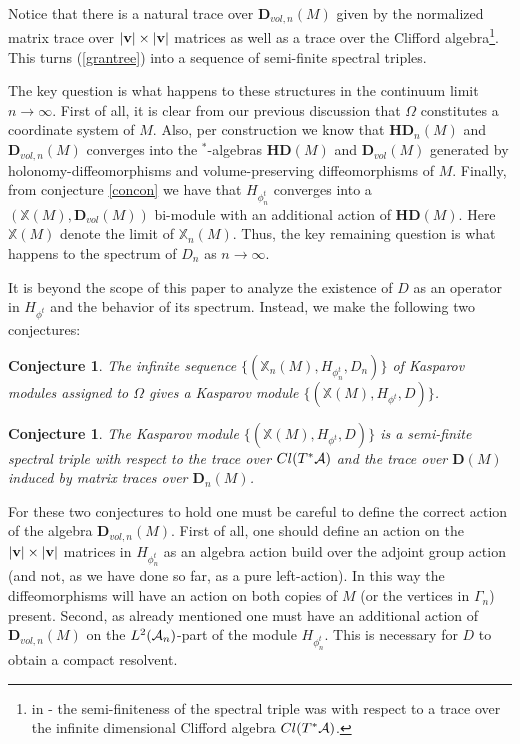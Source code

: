 \documentclass[12pt]{article}
\def\G{\Gamma}
\def\OO{\Omega}
\def\ca{{\cal A}}
\newtheorem{conj}[thm]{Conjecture}
\begin{document}
Notice that there is a natural trace over $\mathbf{D}_{vol,n}(M) $ given by the normalized matrix trace over $\vert {\bf v} \vert \times \vert {\bf v} \vert$ matrices as well as a trace over the Clifford algebra\footnote{in \cite{AGN1}-\cite{AGN3} the semi-finiteness of the spectral triple was with respect to a trace over the infinite dimensional Clifford algebra $Cl(T^*\ca)$.}. This turns (\ref{grantree}) into a sequence of semi-finite spectral triples.

The key question is what happens to these structures in the continuum limit $n\rightarrow\infty$. 
First of all, it is clear from our previous discussion that $\OO$ constitutes a coordinate system of $M$. %
Also, per construction we know that $\mathbf{HD}_n(M) $ and $\mathbf{D}_{vol,n}(M) $ converges into the $^*$-algebras $\mathbf{HD}(M) $ and $\mathbf{D}_{vol}(M) $ generated by holonomy-diffeomorphisms and volume-preserving diffeomorphisms of $M$. Finally, from conjecture \ref{concon} we have that $H_{\phi^t_n}$ converges into a $(\mathbb{X}(M) ,\mathbf{D}_{vol}(M) )$ bi-module with an additional action of $\mathbf{HD}(M) $. Here $\mathbb{X}(M)$ denote the limit of $\mathbb{X}_n(M)$. Thus, the key remaining question is what happens to the spectrum of $D_n$ as $n\rightarrow \infty$.



It is beyond the scope of this paper to analyze the existence of $D$ as an operator in $H_{\phi^t}$ and the behavior of its spectrum. Instead, we make the following two conjectures:
\begin{conj}
\label{conj1}
The infinite sequence $\{    ( \mathbb{X}_n(M)   ,  H_{\phi^t_n} ,D_n )   \} $ of Kasparov modules  assigned to $\OO$ gives a Kasparov module $\{    (  \mathbb{X}(M)  ,  H_{\phi^t} ,D )   \} $.
\end{conj}
\begin{conj}
\label{conj2}
The Kasparov module $\{    ( \mathbb{X}(M) ,  H_{\phi^t} ,D )   \} $ is a semi-finite spectral triple with respect to the trace over $Cl(T^*\ca)$  and the trace over $\mathbf{D}(M) $ induced by matrix traces over $\mathbf{D}_n(M)$.
\end{conj}

For these two conjectures to hold one must be careful to define the correct action of the algebra $\mathbf{D}_{vol,n}(M) $. First of all, one should define an action on the $\vert {\bf v} \vert \times \vert {\bf v} \vert$ matrices in $H_{\phi^t_n}$ as an algebra action build over the adjoint group action (and not, as we have done so far, as a pure left-action). In this way the diffeomorphisms will have an action on both copies of $M$ (or the vertices in $\G_n$) present. Second, as already mentioned one must have an additional action of $\mathbf{D}_{vol,n}(M) $ on the $L^2(\ca_n)$-part of the module $H_{\phi^t_n}$. This is necessary for $D$ to obtain a compact resolvent.
\end{document}
